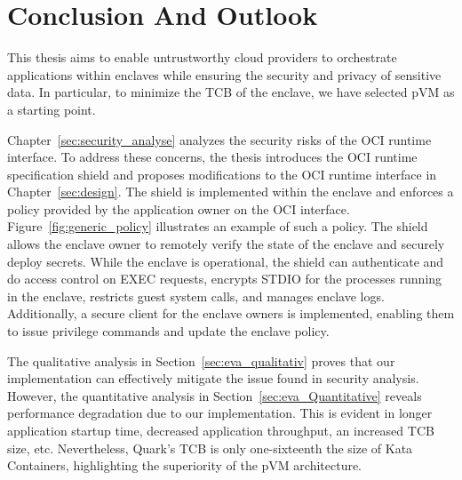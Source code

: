 \chapter{Conclusion And Outlook}
\label{sec:conclusion}





This thesis aims to enable untrustworthy cloud providers to orchestrate applications within enclaves while ensuring the security and privacy of sensitive data. In particular, to minimize the TCB of the enclave, we have selected pVM as a starting point.
 
Chapter~\ref{sec:security_analyse} analyzes the security risks of the OCI runtime interface. To address these concerns, the thesis introduces the OCI runtime specification shield and proposes modifications to the OCI runtime interface in Chapter~\ref{sec:design}. The shield is implemented within the enclave and enforces a policy provided by 
the application owner on the OCI interface. Figure~\ref{fig:generic_policy} illustrates an example of such a policy. The shield allows the enclave owner to remotely verify the state of the enclave and securely deploy secrets. While the enclave is operational, the shield can authenticate and do access control on EXEC requests, 
encrypts STDIO for the processes running in the enclave, restricts guest system calls, and manages enclave logs. Additionally, a secure client for the enclave owners is implemented, enabling them to issue privilege commands and update the enclave policy.
 
The qualitative analysis in Section~\ref{sec:eva_qualitativ} proves that our implementation can effectively mitigate the issue found in security analysis. However, the quantitative analysis in Section~\ref{sec:eva_Quantitative} reveals performance degradation due to our implementation. This is evident in longer application startup time, 
decreased application throughput, an increased TCB size, etc. Nevertheless, Quark's TCB is only one-sixteenth the size of Kata Containers\cite*{Kata-Containers}, highlighting the superiority of the pVM architecture.
 
